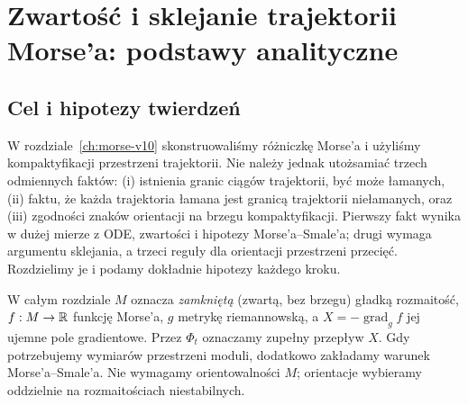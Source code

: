 \chapter{Zwartość i sklejanie trajektorii Morse'a: podstawy analityczne}
\label{ch:morse-analytic-v11}

\section{Cel i hipotezy twierdzeń}
W rozdziale~\ref{ch:morse-v10} skonstruowaliśmy różniczkę
Morse'a i użyliśmy kompaktyfikacji przestrzeni trajektorii.
Nie należy jednak utożsamiać trzech odmiennych faktów:
(i) istnienia granic ciągów trajektorii, być może łamanych,
(ii) faktu, że każda trajektoria łamana jest granicą trajektorii
niełamanych, oraz (iii) zgodności znaków orientacji na
brzegu kompaktyfikacji. Pierwszy fakt wynika w dużej mierze
z ODE, zwartości i hipotezy Morse'a--Smale'a; drugi wymaga
argumentu sklejania, a trzeci reguły dla orientacji
przestrzeni przecięć. Rozdzielimy je i podamy dokładnie
hipotezy każdego kroku.

W całym rozdziale $M$ oznacza \emph{zamkniętą} (zwartą, bez brzegu)
gładką rozmaitość, $f:M\to\mathbb{R}$ funkcję Morse'a, $g$ metrykę
riemannowską, a $X=-\operatorname{grad}_g f$ jej ujemne pole
gradientowe. Przez $\Phi_t$ oznaczamy zupełny przepływ $X$.
Gdy potrzebujemy wymiarów przestrzeni moduli, dodatkowo zakładamy
warunek Morse'a--Smale'a. Nie wymagamy orientowalności $M$;
orientacje wybieramy oddzielnie na rozmaitościach niestabilnych.

